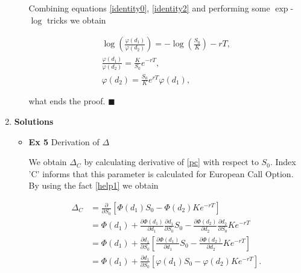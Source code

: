 \documentclass[12pt]{article}
\begin{document}
\begin{enumerate}[leftmargin=\labelsep]
\begin{enumerate}
    Combining equations \eqref{identity0}, \eqref{identity2} and performing some $\exp$-$\log$ tricks we obtain

    \begin{equation}
    \begin{split}
    \log \left( \frac{\varphi(d_1)}{\varphi(d_2)} \right) = -\log\left(\frac{S_0}{K}\right) - rT, \\
    \frac{\varphi(d_1)}{\varphi(d_2)} = \frac{K}{S_0} e^{-rT}, \\
    \varphi(d_2) =\frac{S_0}{K} e^{rT} \varphi(d_1) ,
    \end{split}
    \end{equation}

    what ends the proof. $\blacksquare$
    
\end{enumerate}






\item \textbf{Solutions}

\begin{itemize}
    \item \textbf{Ex 5} Derivation of $\Delta$

We obtain $\Delta_C$ by calculating derivative of \eqref{pc} with respect to $S_0$. Index 'C' informs that this parameter is calculated for European Call Option. By using the fact \eqref{help1} we obtain


\begin{equation}
\begin{split}
 \label{delta_c}
        \Delta_C &= \frac{\partial}{\partial S_0} 
    \left[ \Phi(d_1)S_0 - \Phi(d_2)Ke^{-rT} \right] \\
        &= \Phi(d_1) + 
    \frac{\partial \Phi(d_1) }{\partial d_1} \frac{\partial d_1}{\partial S_0} S_0
    - \frac{\partial \Phi(d_2) }{\partial d_2} \frac{\partial d_2}{\partial S_0}
    Ke^{-rT} \\
        &= \Phi(d_1) + 
     \frac{\partial d_1}{\partial S_0} \left[ 
     \frac{\partial \Phi(d_1) }{\partial d_1}S_0
     - \frac{\partial \Phi(d_2) }{\partial d_2}Ke^{-rT}
     \right] \\
      &= \Phi(d_1) + 
     \frac{\partial d_1}{\partial S_0} \left[ 
     \varphi(d_1)S_0
     -\varphi(d_2)Ke^{-rT}
     \right]. \\   
\end{split}
\end{equation}


\end{itemize}
\end{enumerate}
\end{document}
